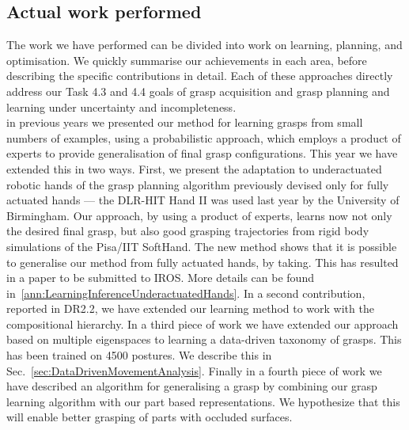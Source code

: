 \documentclass[a4paper,11pt,pdf]{pacmanreport}
\begin{document}
\subsection{Actual work performed}

The work we have performed can be divided into work on learning, planning, and optimisation. We quickly summarise our achievements in each area, before describing the specific contributions in detail. Each of these approaches directly address our Task 4.3 and 4.4 goals of grasp acquisition and grasp planning and learning under uncertainty and incompleteness.\\

 in previous years we presented our method for learning grasps from small numbers of examples, using a probabilistic approach, which employs a product of experts to provide generalisation of final grasp configurations. This year we have extended this in two ways. First, we present the adaptation to underactuated robotic hands of the grasp planning algorithm previously devised only for fully actuated hands --- the DLR-HIT Hand II was used last year by the University of Birmingham. Our approach, by using a product of experts, learns now not only the desired final grasp, but also good grasping trajectories from rigid body simulations of the Pisa/IIT SoftHand. The new method shows that it is possible to generalise our method from fully actuated hands, by taking. This has resulted in a paper to be submitted to IROS. More details can be found in~\ref{ann:LearningInferenceUnderactuatedHands}.  In a second contribution, reported in DR2.2, we have extended our learning method to work with the compositional hierarchy.  In a third piece of work we have extended our approach based on multiple eigenspaces to learning a data-driven taxonomy of grasps. This has been trained on 4500 postures. We describe this in Sec.~\ref{sec:DataDrivenMovementAnalysis}. Finally in a fourth piece of work we have described an algorithm for generalising a grasp by combining our grasp learning algorithm with our part based representations. We hypothesize that this will enable better grasping of parts with occluded surfaces.\\
\end{document}

